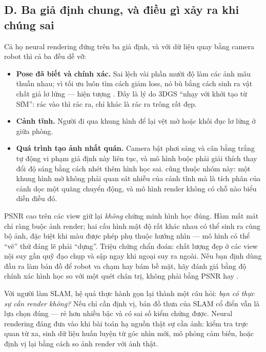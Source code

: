 \documentclass[../../../deep_learning.tex]{subfiles}
\begin{document}
\subsection{D. Ba giả định chung, và điều gì xảy ra khi chúng sai}
Cả họ neural rendering đứng trên ba giả định, và với dữ liệu quay bằng camera robot thì cả ba đều dễ vỡ:
\begin{itemize}
\item \textbf{Pose đã biết và chính xác.} Sai lệch vài phần mười độ làm các ảnh mâu thuẫn nhau; vì tối ưu luôn tìm cách giảm loss, nó bù bằng cách sinh ra vật chất giả lơ lửng --- hiện tượng . Đây là lý do 3DGS ``nhạy với khởi tạo từ SfM'': rác vào thì rác ra, chỉ khác là rác ra trông rất đẹp.
\item \textbf{Cảnh tĩnh.} Người đi qua khung hình để lại vệt mờ hoặc khối đục lơ lửng ở giữa phòng.
\item \textbf{Quá trình tạo ảnh nhất quán.} Camera bật phơi sáng và cân bằng trắng tự động vi phạm giả định này liên tục, và mô hình buộc phải giải thích thay đổi độ sáng bằng cách nhét thêm hình học sai.  cũng thuộc nhóm này: một khung hình mờ không phải quan sát nhiễu của cảnh tĩnh mà là tích phân của cảnh dọc một quãng chuyển động, và mô hình render không có chỗ nào biểu diễn điều đó.
\end{itemize}

\begin{cambay}
PSNR cao trên các view giữ lại \emph{không} chứng minh hình học đúng. Hàm mất mát chỉ ràng buộc ảnh render; hai cấu hình mật độ rất khác nhau có thể sinh ra cùng bộ ảnh, đặc biệt khi màu được phép phụ thuộc hướng nhìn --- mô hình có thể ``vẽ'' thứ đáng lẽ phải ``dựng''. Triệu chứng chẩn đoán: chất lượng đẹp ở các view nội suy gần quỹ đạo chụp và sập ngay khi ngoại suy ra ngoài. Nếu bạn định dùng đầu ra làm bản đồ để robot va chạm hay bám bề mặt, hãy đánh giá bằng độ chính xác hình học so với một quét chân trị, không phải bằng PSNR hay  \cite{zhang2018lpips}.
\end{cambay}

Với người làm SLAM, hệ quả thực hành gọn lại thành một câu hỏi: \emph{bạn có thực sự cần render không?} Nếu chỉ cần định vị, bản đồ thưa của SLAM cổ điển vẫn là lựa chọn đúng --- rẻ hơn nhiều bậc và có sai số kiểm chứng được. Neural rendering đáng đưa vào khi bài toán hạ nguồn thật sự cần ảnh: kiểm tra trực quan từ xa, sinh dữ liệu huấn luyện từ góc nhìn mới, mô phỏng cảm biến, hoặc định vị lại bằng cách so ảnh render với ảnh thật.
\end{document}
